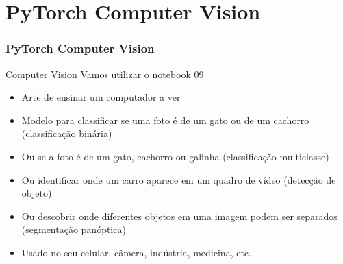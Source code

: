 \documentclass{beamer}
\begin{document}
\begin{frame}
\end{frame}

\section{PyTorch Computer Vision}


\begin{frame}
	\frametitle{PyTorch Computer Vision}
	\begin{block}{Computer Vision}
		Vamos utilizar o notebook 09
			\begin{itemize}
			\item Arte de ensinar um computador a ver
			\item Modelo para classificar se uma foto é de um gato ou de um cachorro (classificação binária)
			\item Ou se a foto é de um gato, cachorro ou galinha (classificação multiclasse)
			\item Ou identificar onde um carro aparece em um quadro de vídeo (detecção de objeto)
			\item Ou descobrir onde diferentes objetos em uma imagem podem ser separados (segmentação panóptica)
			\item Usado no seu celular, câmera, indústria, medicina, etc.
		\end{itemize}
	\end{block}
\end{frame}
\end{document}
